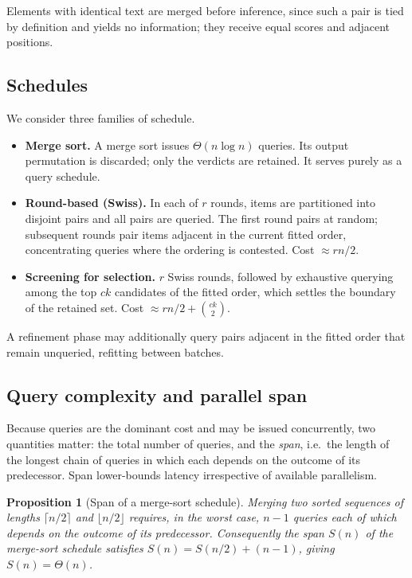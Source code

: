 \documentclass[11pt,a4paper]{article}
\newtheorem{proposition}{Proposition}
\begin{document}
Elements with identical text are merged before inference, since such a pair is
tied by definition and yields no information; they receive equal scores and
adjacent positions.

\subsection{Schedules}

We consider three families of schedule.

\begin{itemize}
  \item \textbf{Merge sort.} A merge sort issues $\Theta(n \log n)$ queries. Its
    output permutation is discarded; only the verdicts are retained. It serves
    purely as a query schedule.
  \item \textbf{Round-based (Swiss).} In each of $r$ rounds, items are
    partitioned into disjoint pairs and all pairs are queried. The first round
    pairs at random; subsequent rounds pair items adjacent in the current fitted
    order, concentrating queries where the ordering is contested. Cost
    ${\approx} rn/2$.
  \item \textbf{Screening for selection.} $r$ Swiss rounds, followed by
    exhaustive querying among the top $ck$ candidates of the fitted order, which
    settles the boundary of the retained set. Cost
    ${\approx} rn/2 + \binom{ck}{2}$.
  \end{itemize}

A refinement phase may additionally query pairs adjacent in the fitted order
that remain unqueried, refitting between batches.

\subsection{Query complexity and parallel span}
\label{sec:span}

Because queries are the dominant cost and may be issued concurrently, two
quantities matter: the total number of queries, and the \emph{span}, i.e.\ the
length of the longest chain of queries in which each depends on the outcome of
its predecessor. Span lower-bounds latency irrespective of available parallelism.

\begin{proposition}[Span of a merge-sort schedule]
\label{prop:span}
Merging two sorted sequences of lengths $\lceil n/2\rceil$ and
$\lfloor n/2\rfloor$ requires, in the worst case, $n-1$ queries each of which
depends on the outcome of its predecessor. Consequently the span $S(n)$ of the
merge-sort schedule satisfies $S(n) = S(n/2) + (n-1)$, giving
$S(n) = \Theta(n)$.
\end{proposition}
\end{document}
